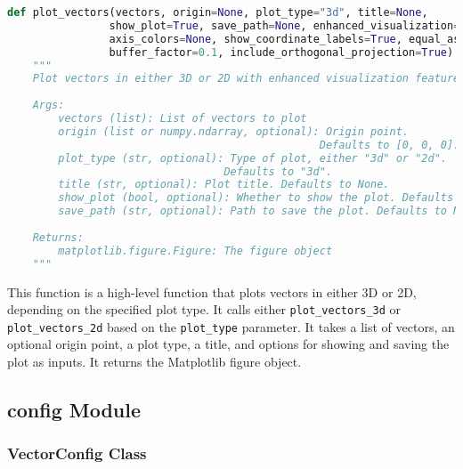 \begin{lstlisting}[language=Python]
def plot_vectors(vectors, origin=None, plot_type="3d", title=None, 
                show_plot=True, save_path=None, enhanced_visualization=True,
                axis_colors=None, show_coordinate_labels=True, equal_aspect_ratio=True,
                buffer_factor=0.1, include_orthogonal_projection=True):
    """
    Plot vectors in either 3D or 2D with enhanced visualization features, depending on the plot_type.
    
    Args:
        vectors (list): List of vectors to plot
        origin (list or numpy.ndarray, optional): Origin point. 
                                                 Defaults to [0, 0, 0].
        plot_type (str, optional): Type of plot, either "3d" or "2d". 
                                  Defaults to "3d".
        title (str, optional): Plot title. Defaults to None.
        show_plot (bool, optional): Whether to show the plot. Defaults to True.
        save_path (str, optional): Path to save the plot. Defaults to None.
        
    Returns:
        matplotlib.figure.Figure: The figure object
    """
\end{lstlisting}

This function is a high-level function that plots vectors in either 3D or 2D, depending on the specified plot type. It calls either \texttt{plot\_vectors\_3d} or \texttt{plot\_vectors\_2d} based on the \texttt{plot\_type} parameter. It takes a list of vectors, an optional origin point, a plot type, a title, and options for showing and saving the plot as inputs. It returns the Matplotlib figure object.

\subsection{config Module}

\subsubsection{VectorConfig Class}


